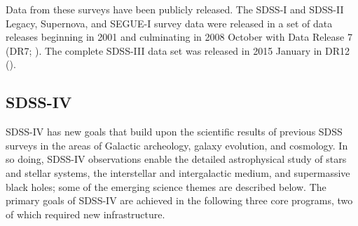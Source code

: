 Data from these surveys have been publicly released.  The SDSS-I and
SDSS-II Legacy, Supernova, and SEGUE-I survey data were released in a
set of data releases beginning in 2001 and culminating in 2008 October
with Data Release 7 (DR7; \citealt{abazajian09a}). The complete
SDSS-III data set was released in 2015 January in DR12
(\citealt{alam15b}).

\subsection{SDSS-IV}

SDSS-IV has new goals that build upon the scientific results of
previous SDSS surveys in the areas of Galactic archeology, galaxy
evolution, and cosmology. In so doing, SDSS-IV observations enable the
detailed astrophysical study of stars and stellar systems, the
interstellar and intergalactic medium, and supermassive black holes;
some of the emerging science themes are described below. The primary
goals of SDSS-IV are achieved in the following three core programs,
two of which required new infrastructure.

